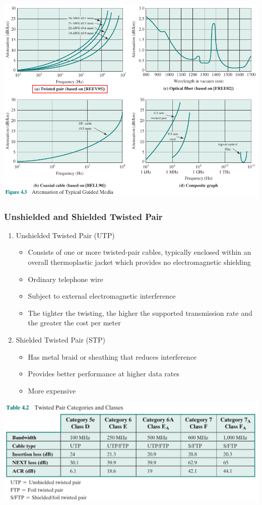 \documentclass[pdflatex,compress]{beamer}
\begin{document}
\begin{frame}
	\begin{center}
		\includegraphics[width=0.8\linewidth]{img/img06}
	\end{center}
\end{frame}

\begin{frame}
	\frametitle{Unshielded and Shielded Twisted Pair}
	\begin{enumerate}
		\item Unshielded Twisted Pair (UTP)
		\begin{itemize}
			\item  Consists of one or more twisted-pair cables, typically enclosed within an overall thermoplastic jacket which provides no electromagnetic shielding
			\item Ordinary telephone wire
			\item Subject to external electromagnetic interference
			\item The tighter the twisting, the higher the supported transmission rate and the greater the cost per meter
		\end{itemize}
		\item Shielded Twisted Pair (STP)
		\begin{itemize}
			\item Has metal braid or sheathing that reduces interference
			\item Provides better performance at higher data rates
			\item More expensive
		\end{itemize}
	\end{enumerate}	
\end{frame}

\begin{frame}
	\begin{center}
		\includegraphics[width=\linewidth]{img/img07}
	\end{center}
\end{frame}
\end{document}
